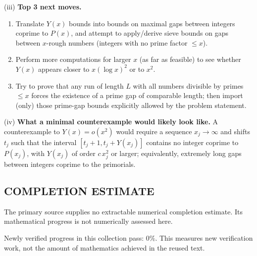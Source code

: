 \smallskip
\noindent(iii) \textbf{Top 3 next moves.}
\begin{enumerate}
\item Translate $Y(x)$ bounds into bounds on maximal gaps between integers coprime to $P(x)$, and attempt to apply/derive sieve bounds on gaps between
$x$-rough numbers (integers with no prime factor $\le x$).
\item Perform more computations for larger $x$ (as far as feasible) to see whether $Y(x)$ appears closer to $x(\log x)^2$ or to $x^2$.
\item Try to prove that any run of length $L$ with all numbers divisible by primes $\le x$ forces the existence of a prime gap of comparable length;
then import (only) those prime-gap bounds explicitly allowed by the problem statement.
\end{enumerate}

\smallskip
\noindent(iv) \textbf{What a minimal counterexample would likely look like.}
A counterexample to $Y(x)=o(x^2)$ would require a sequence $x_j\to\infty$ and shifts $t_j$ such that the interval
$[t_j+1,t_j+Y(x_j)]$ contains no integer coprime to $P(x_j)$, with $Y(x_j)$ of order $c\,x_j^2$ or larger; equivalently, extremely long
gaps between integers coprime to the primorials.




\subsection*{COMPLETION ESTIMATE}
The primary source supplies no extractable numerical completion estimate. Its mathematical progress is not numerically assessed here.

Newly verified progress in this collection pass: $0\%$. This measures new verification work, not the amount of mathematics achieved in the reused text.
